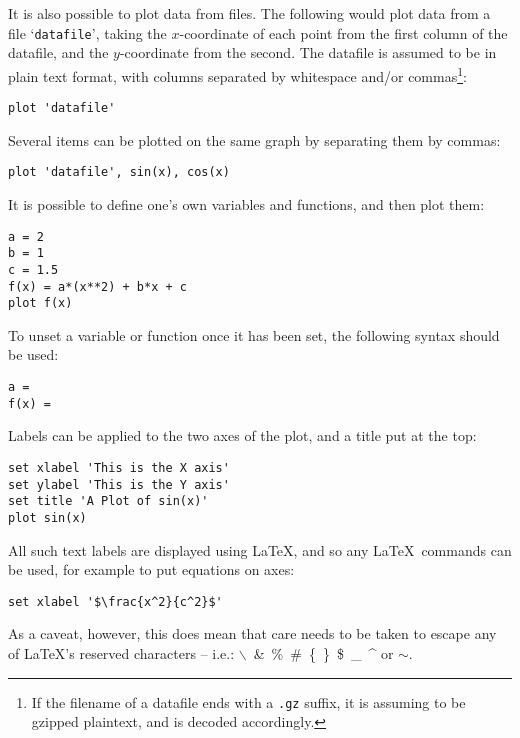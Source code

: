 \documentclass[a4paper,onecolumn,11pt]{book}
\begin{document}
\noindent It is also possible to plot data from files. The following would plot
data from a file `\texttt{datafile}', taking the $x$-coordinate of each point
from the first column of the datafile, and the $y$-coordinate from the second.
The datafile is assumed to be in plain text format, with columns separated by
whitespace and/or commas\footnote{If the filename of a datafile ends with a
\texttt{.gz} suffix, it is assuming to be gzipped plaintext, and is decoded
accordingly.}:

\begin{verbatim}
plot 'datafile'
\end{verbatim}

Several items can be plotted on the same graph by separating them by commas:

\begin{verbatim}
plot 'datafile', sin(x), cos(x)
\end{verbatim}

\noindent It is possible to define one's own variables and functions, and then
plot them:

\begin{verbatim}
a = 2
b = 1
c = 1.5
f(x) = a*(x**2) + b*x + c
plot f(x)
\end{verbatim}

\noindent To unset a variable or function once it has been set, the following
syntax should be
used:

\begin{verbatim}
a =
f(x) =
\end{verbatim}

Labels can be applied to the two axes of the plot, and a title put at the top:

\begin{verbatim}
set xlabel 'This is the X axis'
set ylabel 'This is the Y axis'
set title 'A Plot of sin(x)'
plot sin(x)
\end{verbatim}

\noindent All such text labels are displayed using \LaTeX, and so any \LaTeX\ 
commands can be used, for example to put equations on axes:

\begin{verbatim}
set xlabel '$\frac{x^2}{c^2}$'
\end{verbatim}


\noindent As a caveat, however, this does mean that care needs to be taken to
escape any of \LaTeX's reserved characters -- i.e.:
$\backslash$~\&~\%~\#~\{~\}~\$~\_~\^{} or $\sim$.
\end{document}
